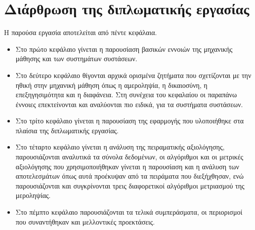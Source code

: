 \section{Διάρθρωση της διπλωματικής εργασίας}
\noindent Η παρούσα εργασία αποτελείται από πέντε κεφάλαια.
\begin{itemize}
	\item  Στο πρώτο κεφάλαιο γίνεται η παρουσίαση βασικών εννοιών της μηχανικής μάθησης και των συστημάτων συστάσεων.
	\item Στο δεύτερο κεφάλαιο θίγονται αρχικά ορισμένα ζητήματα που σχετίζονται με την ηθική στην μηχανική μάθηση όπως η αμεροληψία, η δικαιοσύνη, η επεξηγησιμότητα και η διαφάνεια. Στη συνέχεια του κεφαλαίου οι παραπάνω έννοιες επεκτείνονται και αναλύονται πιο ειδικά, για τα συστήματα συστάσεων.
	\item Στο τρίτο κεφάλαιο γίνεται η παρουσίαση της εφαρμογής που υλοποιήθηκε στα πλαίσια της διπλωματικής εργασίας. 
	\item Στο τέταρτο κεφάλαιο γίνεται η ανάλυση της πειραματικής αξιολόγησης, παρουσιάζονται αναλυτικά τα σύνολα δεδομένων, οι αλγόριθμοι και οι μετρικές αξιολόγησης που χρησιμοποιήθηκαν γίνεται η παρουσίαση και η ανάλυση των αποτελεσμάτων όπως αυτά προέκυψαν από τα πειράματα που διεξήχθησαν, ενώ παρουσιάζονται και συγκρίνονται τρεις διαφορετικοί αλγόριθμοι μετριασμού της μεροληψίας.
	\item Στο πέμπτο κεφάλαιο παρουσιάζονται τα τελικά συμπεράσματα, οι περιορισμοί που συναντήθηκαν και μελλοντικές προεκτάσεις.
\end{itemize}